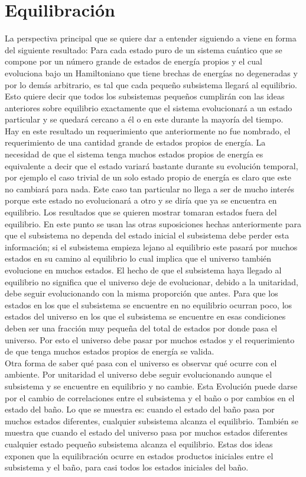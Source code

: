 \section{Equilibración}

La perspectiva principal que se quiere dar a entender siguiendo a \cite{LindenPaper} viene en forma del siguiente resultado: Para cada estado puro de un sistema cuántico que se compone por un número grande de estados de energía propios y el cual evoluciona bajo un Hamiltoniano que tiene brechas de energías no degeneradas y por lo demás arbitrario, es tal que cada pequeño subsistema llegará al equilibrio. Esto quiere decir que todos los subsistemas pequeños cumplirán con las ideas anteriores sobre equilibrio exactamente que el sistema evolucionará a un estado particular y se quedará cercano a él o en este durante la mayoría del tiempo.
\\
Hay en este resultado un requerimiento que anteriormente no fue nombrado, el requerimiento de una cantidad grande de estados propios de energía. La necesidad de que el sistema tenga muchos estados propios de energía es equivalente a decir que el estado variará bastante durante su evolución temporal, por ejemplo el caso trivial de un solo estado propio de energía es claro que este no cambiará para nada. Este caso tan particular no llega a ser de mucho interés porque este estado no evolucionará a otro y se diría que ya se encuentra en equilibrio. Los resultados que se quieren mostrar tomaran estados fuera del equilibrio. En este punto se usan las otras suposiciones hechas anteriormente para que el subsistema no dependa del estado inicial el subsistema debe perder esta información; si el subsistema empieza lejano al equilibrio este pasará  por muchos estados en su camino al equilibrio lo cual implica que el universo también evolucione en muchos estados. El hecho de que el subsistema haya llegado al equilibrio no significa que el universo deje de evolucionar, debido a la unitaridad, debe seguir evolucionando con la misma proporción que antes. Para que los estados en los que el subsistema se encuentre en no equilibrio ocurran poco, los estados del universo en los que el subsistema se encuentre en esas condiciones deben ser una fracción muy pequeña del total de estados por donde pasa el universo. Por esto el universo debe pasar por muchos estados y el requerimiento de que tenga muchos estados propios de energía se valida. 
\\
Otra forma de saber qué pasa con el universo es observar qué ocurre con el ambiente. Por unitaridad el universo debe seguir evolucionando aunque el subsistema y se encuentre en equilibrio y no cambie. Esta Evolución puede darse por el cambio de correlaciones entre el subsistema y el baño o por cambios en el estado del baño. Lo que se muestra es: cuando el estado del baño pasa por muchos estados diferentes, cualquier subsistema alcanza el equilibrio. También se muestra que cuando el estado del universo pasa por muchos estados diferentes cualquier estado pequeño subsistema alcanza el equilibrio. Estas dos ideas  exponen que la equilibración ocurre en estados productos iniciales entre el subsistema y el baño, para casi todos los estados iniciales del baño.
\\

